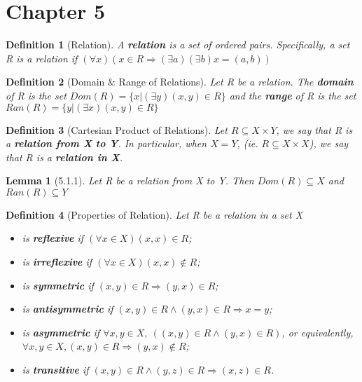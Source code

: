 \documentclass[12pt, letterpaper]{article}
\theoremstyle{plain}
\newtheorem*{lemma*}{Lemma}
\newtheorem*{definition*}{Definition}
\begin{document}
\section*{Chapter 5}
    \begin{mdframed}[leftmargin=0.01cm, rightmargin=0.01cm]
        \begin{definition*}[Relation]
            A \textbf{relation} is a set of ordered pairs. Specifically, a set R is a relation if $(\forall x)(x \in R \Rightarrow (\exists a)(\exists b)x = (a,b))$
        \end{definition*}
        \begin{definition*}[Domain \& Range of Relations]
            Let R be a relation. The \textbf{domain} of R is the set $Dom(R) = \{x | (\exists y)(x,y) \in R\}$ and the \textbf{range} of R is the set \\$Ran(R) = \{y | (\exists x)(x,y) \in R\}$
        \end{definition*}
        \begin{definition*}[Cartesian Product of Relations]
            Let $R \subseteq X \times Y$, we say that R is a \textbf{relation from X to Y}. In particular, when $X = Y$, (ie. $R \subseteq X \times X$), we say that R is a \textbf{relation in X}.
        \end{definition*}
        \begin{lemma*}[5.1.1]
            Let R be a relation from X to Y. Then $Dom(R) \subseteq X$ and $Ran(R) \subseteq Y$
        \end{lemma*}
        \begin{definition*}[Properties of Relation]
            Let R be a relation in a set X
            \begin{itemize}
                \item[R] is \textbf{reflexive} if $(\forall x \in X)(x,x) \in R$;
                \item[R] is \textbf{irreflexive} if $(\forall x \in X)(x,x) \notin R$;
                \item[R] is \textbf{symmetric} if $(x,y) \in R \Rightarrow (y,x) \in R$;
                \item[R] is \textbf{antisymmetric} if $(x,y) \in R \wedge (y,x) \in R \Rightarrow x = y$;
                \item[R] is \textbf{asymmetric} if $\forall x,y \in X, ~((x,y) \in R \wedge (y,x)\in R)$, or equivalently, \\ $\forall x,y \in X, (x,y) \in R \Rightarrow (y,x) \notin R$;
                \item[R] is \textbf{transitive} if $(x,y) \in R \wedge (y,z) \in R \Rightarrow (x,z) \in R$.

\end{itemize}
\end{definition*}
\end{mdframed}
\end{document}
